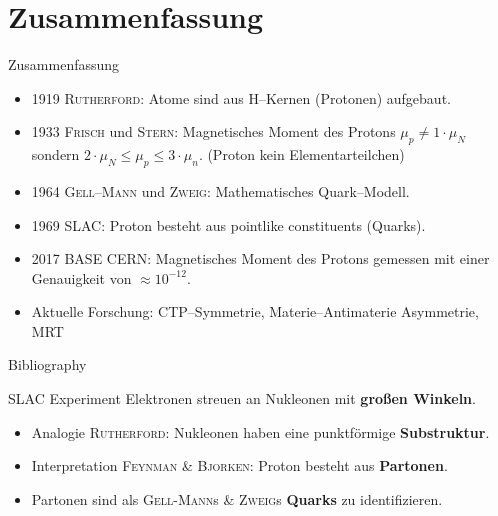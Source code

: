 \documentclass[t,9pt]{beamer}
\begin{document}
        \section{Zusammenfassung}

        \begin{frame}{Zusammenfassung}
                \begin{itemize}
                        \item 1919 \textsc{Rutherford}: Atome sind aus H--Kernen (Protonen) aufgebaut.
                        \item 1933 \textsc{Frisch} und \textsc{Stern}: Magnetisches Moment des Protons $\mu _p\neq 1\cdot \mu _N$ sondern $2\cdot \mu _N\leq \mu _p\leq 3\cdot \mu _n$. (Proton kein Elementarteilchen)
                        \item 1964 \textsc{Gell--Mann} und \textsc{Zweig}: Mathematisches Quark--Modell.
                        \item 1969 SLAC: Proton besteht aus \glqq pointlike constituents\grqq{} (Quarks).
                        \item 2017 BASE CERN: Magnetisches Moment des Protons gemessen mit einer Genauigkeit von $\approx 10^{-12}$.
                        \item Aktuelle Forschung: CTP--Symmetrie, Materie--Antimaterie Asymmetrie, MRT
                \end{itemize}         
        \end{frame}

        \begin{frame}[allowframebreaks]{Bibliography}
                \tiny
                
                
        \end{frame}

        \iffalse\begin{frame}{SLAC Experiment}
                Elektronen streuen an Nukleonen mit \textbf{großen Winkeln}. %
                \begin{itemize}
                        \item Analogie \textsc{Rutherford}: Nukleonen haben eine punktförmige \textbf{Substruktur}.
                                \pause
                        \item Interpretation \textsc{Feynman} \& \textsc{Bjorken}: Proton besteht aus \textbf{Partonen}.
                        \item Partonen sind als \textsc{Gell-Mann}s \& \textsc{Zweig}s \textbf{Quarks} zu identifizieren. %
                \end{itemize}
        \end{frame}
\end{document}
